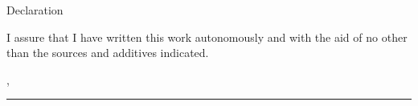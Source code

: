 
\newpage

\fontsize{18pt}{20pt}\selectfont

\vspace{25.3mm}
Declaration

\normalsize\selectfont
\vspace{13.2mm}
I assure that I have written this work autonomously and with the aid of no other than the sources and additives indicated.

\vspace{6mm}
\eingereichtamort, \eingereichtamdatum

\vspace{10mm}
\rule[-3.7mm]{.5\linewidth}{0.5pt}\\
\derauthor

